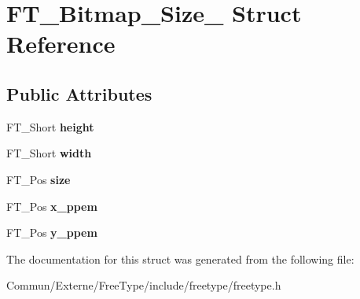 \hypertarget{struct_f_t___bitmap___size__}{}\section{F\+T\+\_\+\+Bitmap\+\_\+\+Size\+\_\+ Struct Reference}
\label{struct_f_t___bitmap___size__}
\subsection*{Public Attributes}
\begin{DoxyCompactItemize}
\item 
F\+T\+\_\+\+Short {\bfseries height}\hypertarget{struct_f_t___bitmap___size___adf2f24039b458ff4674712886f242262}{}\label{struct_f_t___bitmap___size___adf2f24039b458ff4674712886f242262}

\item 
F\+T\+\_\+\+Short {\bfseries width}\hypertarget{struct_f_t___bitmap___size___ab9da94223f75a89a649d1e6d018b17f1}{}\label{struct_f_t___bitmap___size___ab9da94223f75a89a649d1e6d018b17f1}

\item 
F\+T\+\_\+\+Pos {\bfseries size}\hypertarget{struct_f_t___bitmap___size___a1db23a6220fb6bcb712430821a6e5352}{}\label{struct_f_t___bitmap___size___a1db23a6220fb6bcb712430821a6e5352}

\item 
F\+T\+\_\+\+Pos {\bfseries x\+\_\+ppem}\hypertarget{struct_f_t___bitmap___size___a6f877a792d2dc93328037c928979215f}{}\label{struct_f_t___bitmap___size___a6f877a792d2dc93328037c928979215f}

\item 
F\+T\+\_\+\+Pos {\bfseries y\+\_\+ppem}\hypertarget{struct_f_t___bitmap___size___a60d4d003d09fd57505f69f39e31e19c1}{}\label{struct_f_t___bitmap___size___a60d4d003d09fd57505f69f39e31e19c1}

\end{DoxyCompactItemize}


The documentation for this struct was generated from the following file\+:\begin{DoxyCompactItemize}
\item 
Commun/\+Externe/\+Free\+Type/include/freetype/freetype.\+h\end{DoxyCompactItemize}
